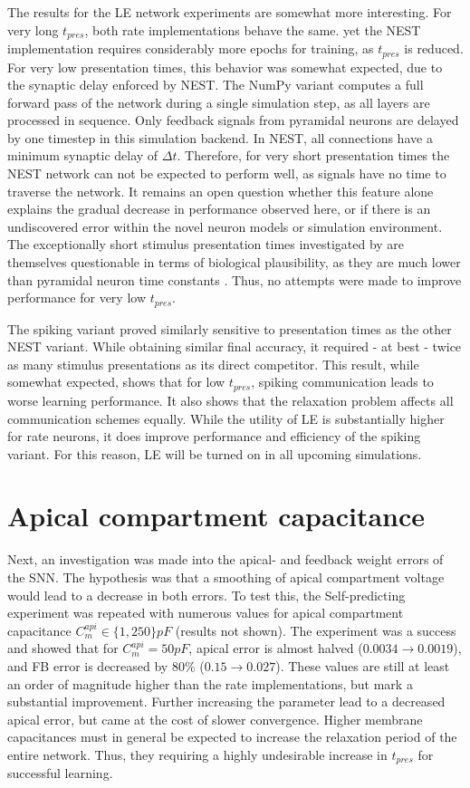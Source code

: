 The results for the LE network experiments are somewhat more interesting. For very long $t_{pres}$, both rate
implementations behave the same. yet the NEST implementation requires considerably more epochs for training, as
$t_{pres}$ is reduced. For very low presentation times, this behavior was somewhat expected, due to the synaptic delay
enforced by NEST. The NumPy variant computes a full forward pass of the network during a single simulation step, as all
layers are processed in sequence. Only feedback signals from pyramidal neurons are delayed by one timestep in this
simulation backend. In NEST, all connections have a minimum synaptic delay of $\Delta t$. Therefore, for very short
presentation times the NEST network can not be expected to perform well, as signals have no time to traverse the
network. It remains an open question whether this feature alone explains the gradual decrease in performance observed
here, or if there is an undiscovered error within the novel neuron models or simulation environment. The exceptionally
short stimulus presentation times investigated by \citep{Haider2021} are themselves questionable in terms of biological
plausibility, as they are much lower than pyramidal neuron time constants \citep{McCormick1985}. Thus, no attempts were
made to improve performance for very low $t_{pres}$.

The spiking variant proved similarly sensitive to presentation times as the other NEST variant. While obtaining similar
final accuracy, it required - at best - twice as many stimulus presentations as its direct competitor. This result,
while somewhat expected, shows that for low $t_{pres}$, spiking communication leads to worse learning performance. It
also shows that the relaxation problem affects all communication schemes equally. While the utility of LE is
substantially higher for rate neurons, it does improve performance and efficiency of the spiking variant. For this
reason, LE will be turned on in all upcoming simulations.



\section{Apical compartment capacitance}\label{sec-c-m-api}

Next, an investigation was made into the apical- and feedback weight errors of the SNN. The hypothesis was that a
smoothing of apical compartment voltage would lead to a decrease in both errors. To test this, the Self-predicting
experiment was repeated with numerous values for apical compartment capacitance $C_m^{api} \in \{ 1, 250 \} pF$ (results
not shown). The experiment was a success and showed that for $C_m^{api} = 50pF$, apical error is almost halved ($0.0034
\rightarrow 0.0019$), and FB error is decreased by $80\%$ ($0.15 \rightarrow 0.027$). These values are still at least an
order of magnitude higher than the rate implementations, but mark a substantial improvement. Further increasing the
parameter lead to a decreased apical error, but came at the cost of slower convergence. Higher membrane capacitances
must in general be expected to increase the relaxation period of the entire network. Thus, they requiring a highly
undesirable increase in $t_{pres}$ for successful learning.

